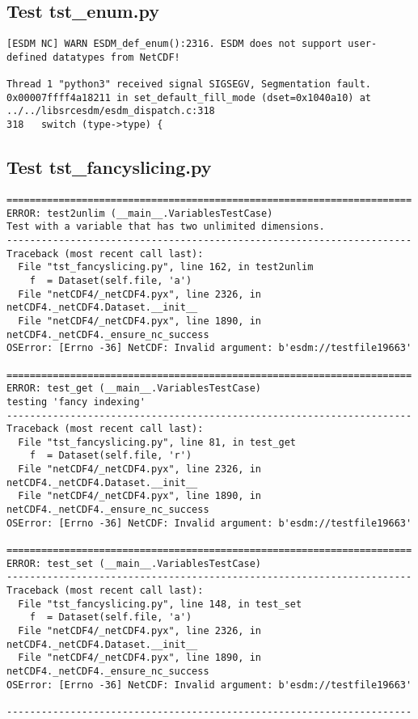 \subsection{Test tst\_enum.py}

\begin{verbatim}
[ESDM NC] WARN ESDM_def_enum():2316. ESDM does not support user-defined datatypes from NetCDF!

Thread 1 "python3" received signal SIGSEGV, Segmentation fault.
0x00007ffff4a18211 in set_default_fill_mode (dset=0x1040a10) at ../../libsrcesdm/esdm_dispatch.c:318
318	  switch (type->type) {
\end{verbatim}

\subsection{Test tst\_fancyslicing.py}

\begin{verbatim}
======================================================================
ERROR: test2unlim (__main__.VariablesTestCase)
Test with a variable that has two unlimited dimensions.
----------------------------------------------------------------------
Traceback (most recent call last):
  File "tst_fancyslicing.py", line 162, in test2unlim
    f  = Dataset(self.file, 'a')
  File "netCDF4/_netCDF4.pyx", line 2326, in netCDF4._netCDF4.Dataset.__init__
  File "netCDF4/_netCDF4.pyx", line 1890, in netCDF4._netCDF4._ensure_nc_success
OSError: [Errno -36] NetCDF: Invalid argument: b'esdm://testfile19663'

======================================================================
ERROR: test_get (__main__.VariablesTestCase)
testing 'fancy indexing'
----------------------------------------------------------------------
Traceback (most recent call last):
  File "tst_fancyslicing.py", line 81, in test_get
    f  = Dataset(self.file, 'r')
  File "netCDF4/_netCDF4.pyx", line 2326, in netCDF4._netCDF4.Dataset.__init__
  File "netCDF4/_netCDF4.pyx", line 1890, in netCDF4._netCDF4._ensure_nc_success
OSError: [Errno -36] NetCDF: Invalid argument: b'esdm://testfile19663'

======================================================================
ERROR: test_set (__main__.VariablesTestCase)
----------------------------------------------------------------------
Traceback (most recent call last):
  File "tst_fancyslicing.py", line 148, in test_set
    f  = Dataset(self.file, 'a')
  File "netCDF4/_netCDF4.pyx", line 2326, in netCDF4._netCDF4.Dataset.__init__
  File "netCDF4/_netCDF4.pyx", line 1890, in netCDF4._netCDF4._ensure_nc_success
OSError: [Errno -36] NetCDF: Invalid argument: b'esdm://testfile19663'

----------------------------------------------------------------------
\end{verbatim}

